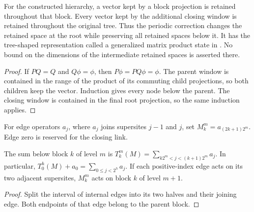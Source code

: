 \begin{lemma}
    \label{thm:hastings05_retained_tree}
    \leanok
    For the constructed hierarchy, a vector kept by a block projection is
    retained throughout that block. Every vector kept by the additional
    closing window is retained throughout the original tree.
    Thus the periodic correction changes the retained space at the root
    while preserving all retained spaces below it. It has the tree-shaped
    representation called a generalized matrix product state in
    \cite[lines 596--607 and 732--743]{Hastings2006Solving}. No bound on the
    dimensions of the intermediate retained spaces is asserted there.
\end{lemma}
\begin{proof}\leanok
    If $PQ=Q$ and $Q\phi=\phi$, then $P\phi=PQ\phi=\phi$.
    The parent window is contained in the range of the product of its
    commuting child projections, so both children keep the vector.
    Induction gives every node below the parent. The closing window is
    contained in the final root projection, so the same induction applies.
\end{proof}

\begin{definition}
    \label{def:hastings05_hierarchy_edge}
    \leanok
    For edge operators $a_j$, where $a_j$ joins supersites $j-1$ and $j$,
    set $M_k^m=a_{(2k+1)2^m}$. Edge zero is reserved for the closing link.
\end{definition}

\begin{lemma}
    \label{thm:hastings05_hierarchy_edges}
    \leanok
    The sum below block $k$ of level $m$ is
    $T_k^m(M)=\sum_{k2^m<j<(k+1)2^m}a_j$. In particular,
    $T_0^h(M)+a_0=\sum_{0\le j<2^h}a_j$.
    If each positive-index edge acts on its two adjacent supersites,
    $M_k^m$ acts on block $k$ of level $m+1$.
\end{lemma}
\begin{proof}\leanok
    Split the interval of internal edges into its two halves and their
    joining edge. Both endpoints of that edge belong to the parent block.
\end{proof}

